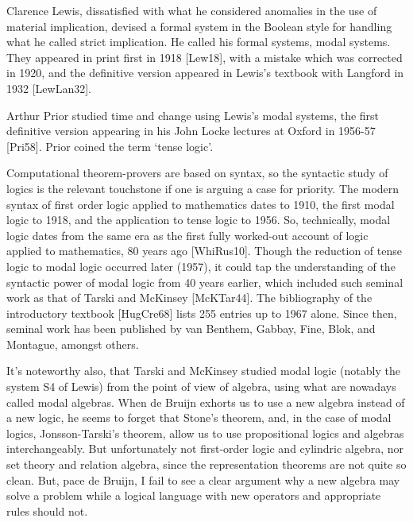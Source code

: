 \begin{spec}
Clarence Lewis, dissatisfied with what he considered anomalies in
the use of material implication, devised a formal system in the
Boolean style for handling what he called strict implication.  He
called his formal systems, modal systems.  They appeared in print
first in 1918 [Lew18], with a mistake which was corrected in 1920,
and the definitive version appeared in Lewis's textbook with
Langford in 1932 [LewLan32].

Arthur Prior studied time and change using Lewis's modal systems,
the first definitive version appearing in his John Locke lectures at
Oxford in 1956-57 [Pri58]. Prior coined the term `tense logic'.

Computational theorem-provers are based on syntax, so the syntactic
study of logics is the relevant touchstone if one is arguing a case
for priority.  The modern syntax of first order logic applied to
mathematics dates to 1910, the first modal logic to 1918, and the
application to tense logic to 1956. So, technically, modal logic
dates from the same era as the first fully worked-out account of
logic applied to mathematics, 80 years ago [WhiRus10]. Though the
reduction of tense logic to modal logic occurred later (1957), it
could tap the understanding of the syntactic power of modal logic
from 40 years earlier, which included such seminal work as that of
Tarski and McKinsey [McKTar44]. The bibliography of the introductory
textbook [HugCre68] lists 255 entries up to 1967 alone. Since then,
seminal work has been published by van Benthem, Gabbay, Fine, Blok,
and Montague, amongst others.

It's noteworthy also, that Tarski and McKinsey studied modal logic
(notably the system S4 of Lewis) from the point of view of algebra,
using what are nowadays called modal algebras. When de Bruijn
exhorts us to use a new algebra instead of a new logic, he seems to
forget that Stone's theorem, and, in the case of modal logics,
Jonsson-Tarski's theorem, allow us to use propositional logics and
algebras interchangeably. But unfortunately not first-order logic
and cylindric algebra, nor set theory and relation algebra, since
the representation theorems are not quite so clean. But, pace de
Bruijn, I fail to see a clear argument why a new algebra may solve a
problem while a logical language with new operators and appropriate
rules should not.


\end{spec}
